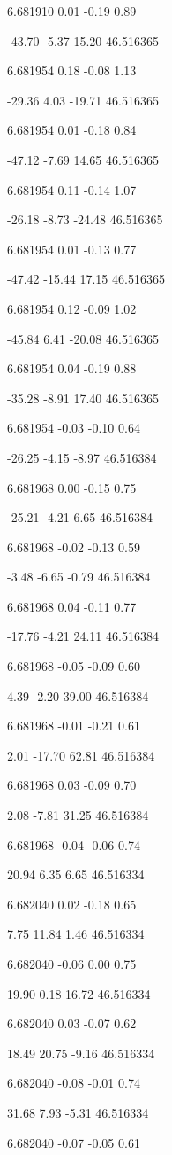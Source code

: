 6.681910
0.01
-0.19
0.89

-43.70
-5.37
15.20
46.516365

6.681954
0.18
-0.08
1.13

-29.36
4.03
-19.71
46.516365

6.681954
0.01
-0.18
0.84

-47.12
-7.69
14.65
46.516365

6.681954
0.11
-0.14
1.07

-26.18
-8.73
-24.48
46.516365

6.681954
0.01
-0.13
0.77

-47.42
-15.44
17.15
46.516365

6.681954
0.12
-0.09
1.02

-45.84
6.41
-20.08
46.516365

6.681954
0.04
-0.19
0.88

-35.28
-8.91
17.40
46.516365

6.681954
-0.03
-0.10
0.64

-26.25
-4.15
-8.97
46.516384

6.681968
0.00
-0.15
0.75

-25.21
-4.21
6.65
46.516384

6.681968
-0.02
-0.13
0.59

-3.48
-6.65
-0.79
46.516384

6.681968
0.04
-0.11
0.77

-17.76
-4.21
24.11
46.516384

6.681968
-0.05
-0.09
0.60

4.39
-2.20
39.00
46.516384

6.681968
-0.01
-0.21
0.61

2.01
-17.70
62.81
46.516384

6.681968
0.03
-0.09
0.70

2.08
-7.81
31.25
46.516384

6.681968
-0.04
-0.06
0.74

20.94
6.35
6.65
46.516334

6.682040
0.02
-0.18
0.65

7.75
11.84
1.46
46.516334

6.682040
-0.06
0.00
0.75

19.90
0.18
16.72
46.516334

6.682040
0.03
-0.07
0.62

18.49
20.75
-9.16
46.516334

6.682040
-0.08
-0.01
0.74

31.68
7.93
-5.31
46.516334

6.682040
-0.07
-0.05
0.61


